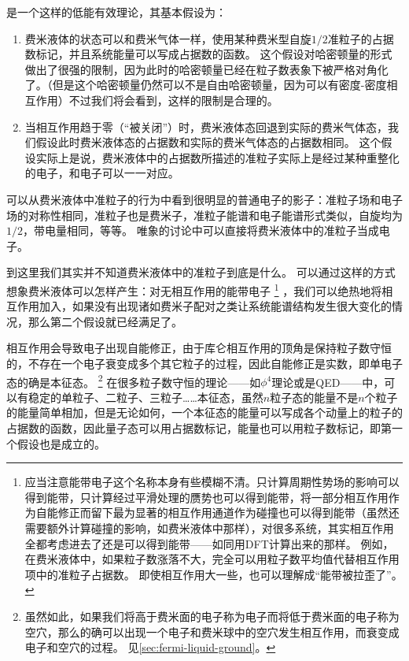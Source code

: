 是一个这样的低能有效理论，其基本假设为：
\begin{enumerate}
    \item 费米液体的状态可以和费米气体一样，使用某种费米型自旋$1/2$准粒子的占据数标记，并且系统能量可以写成占据数的函数。
    这个假设对哈密顿量的形式做出了很强的限制，因为此时的哈密顿量已经在粒子数表象下被严格对角化了。（但是这个哈密顿量仍然可以不是自由哈密顿量，因为可以有密度-密度相互作用）不过我们将会看到，这样的限制是合理的。
    \item 当相互作用趋于零（“被关闭”）时，费米液体态回退到实际的费米气体态，我们假设此时费米液体态的占据数和实际的费米气体态的占据数相同。
    这个假设实际上是说，费米液体中的占据数所描述的准粒子实际上是经过某种重整化的电子，和电子可以一一对应。
\end{enumerate}

可以从费米液体中准粒子的行为中看到很明显的普通电子的影子：准粒子场和电子场的对称性相同，准粒子也是费米子，准粒子能谱和电子能谱形式类似，自旋均为$1/2$，带电量相同，等等。
唯象的讨论中可以直接将费米液体中的准粒子当成电子。

到这里我们其实并不知道费米液体中的准粒子到底是什么。
可以通过这样的方式想象费米液体可以怎样产生：对无相互作用的能带电子%
\footnote{
    应当注意能带电子这个名称本身有些模糊不清。只计算周期性势场的影响可以得到能带，只计算经过平滑处理的赝势也可以得到能带，将一部分相互作用作为自能修正而留下最为显著的相互作用通道作为碰撞也可以得到能带（虽然还需要额外计算碰撞的影响，如费米液体中那样），对很多系统，其实相互作用全都考虑进去了还是可以得到能带——如同用DFT计算出来的那样。
    例如，在费米液体中，如果粒子数涨落不大，完全可以用粒子数平均值代替相互作用项中的准粒子占据数。
    即使相互作用大一些，也可以理解成“能带被拉歪了”。
}%
，我们可以绝热地将相互作用加入，如果没有出现诸如费米子配对之类让系统能谱结构发生很大变化的情况，那么第二个假设就已经满足了。

相互作用会导致电子出现自能修正，由于库仑相互作用的顶角是保持粒子数守恒的，不存在一个电子衰变成多个其它粒子的过程，因此自能修正是实数，即单电子态的确是本征态。%
\footnote{
    虽然如此，如果我们将高于费米面的电子称为电子而将低于费米面的电子称为空穴，那么的确可以出现一个电子和费米球中的空穴发生相互作用，而衰变成电子和空穴的过程。
    见\autoref{sec:fermi-liquid-ground}。
}%
在很多粒子数守恒的理论——如$\phi^4$理论或是QED——中，可以有稳定的单粒子、二粒子、三粒子……本征态，虽然$n$粒子态的能量不是$n$个粒子的能量简单相加，但是无论如何，一个本征态的能量可以写成各个动量上的粒子的占据数的函数，因此量子态可以用占据数标记，能量也可以用粒子数标记，即第一个假设也是成立的。


